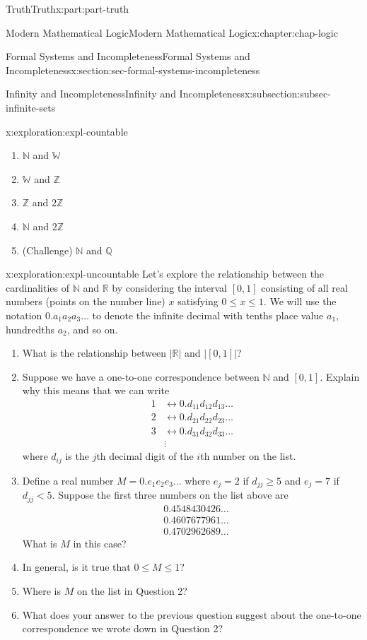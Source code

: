\documentclass[oneside,10pt,]{book}
\numberwithin{equation}{section}
\renewcommand{\le}{\leqslant}
\renewcommand{\ge}{\geqslant}
\newcommand{\lt}{<}
\newcommand{\amp}{&}
\begin{document}
\begin{partptx}{Truth}{}{Truth}{}{}{x:part:part-truth}
\begin{chapterptx}{Modern Mathematical Logic}{}{Modern Mathematical Logic}{}{}{x:chapter:chap-logic}
\begin{sectionptx}{Formal Systems and Incompleteness}{}{Formal Systems and Incompleteness}{}{}{x:section:sec-formal-systems-incompleteness}
\begin{subsectionptx}{Infinity and Incompleteness}{}{Infinity and Incompleteness}{}{}{x:subsection:subsec-infinite-sets}
\begin{exploration}{}{x:exploration:expl-countable}
%
\begin{enumerate}
\item{}\(\mathbb{N}\) and \(\mathbb{W}\)%
\item{}\(\mathbb{W}\) and \(\mathbb{Z}\)%
\item{}\(\mathbb{Z}\) and \(2\mathbb{Z}\)%
\item{}\(\mathbb{N}\) and \(2\mathbb{Z}\)%
\item{}(Challenge) \(\mathbb{N}\) and \(\mathbb{Q}\)%
\end{enumerate}
\end{exploration}%
\begin{exploration}{}{x:exploration:expl-uncountable}%
Let's explore the relationship between the cardinalities of \(\mathbb{N}\) and \(\mathbb{R}\) by considering the interval \([0,1]\) consisting of all real numbers (points on the number line) \(x\) satisfying \(0 \le x \le 1\). We will use the notation \(0.a_1 a_2 a_3 \ldots\) to denote the infinite decimal with tenths place value \(a_1\), hundredths \(a_2\), and so on.%
%
\begin{enumerate}
\item{}What is the relationship between \(|\mathbb{R}|\) and \(|[0,1]|\)?%
\item{}Suppose we have a one-to-one correspondence between \(\mathbb{N}\) and \([0,1]\). Explain why this means that we can write%
\begin{align*}
1 \amp \leftrightarrow 0.d_{11}d_{12}d_{13}\ldots\\
2 \amp \leftrightarrow 0.d_{21}d_{22}d_{23}\ldots\\
3 \amp \leftrightarrow 0.d_{31}d_{32}d_{33}\ldots\\
\amp \vdots 
\end{align*}
where \(d_{ij}\) is the \(j\)th decimal digit of the \(i\)th number on the list.%
\item{}Define a real number \(M = 0.e_1 e_2 e_3 \ldots\) where \(e_j = 2\) if \(d_{jj} \ge 5\) and \(e_j = 7\) if \(d_{jj} \lt 5\). Suppose the first three numbers on the list above are%
\begin{align*}
\amp 0.4548430426\ldots\\
\amp 0.4607677961\ldots\\
\amp 0.4702962689\ldots
\end{align*}
What is \(M\) in this case?%
\item{}In general, is it true that \(0 \le M \le 1\)?%
\item{}Where is \(M\) on the list in Question 2?%
\item{}What does your answer to the previous question suggest about the one-to-one correspondence we wrote down in Question 2?%

\end{enumerate}
\end{exploration}
\end{subsectionptx}
\end{sectionptx}
\end{chapterptx}
\end{partptx}
\end{document}
